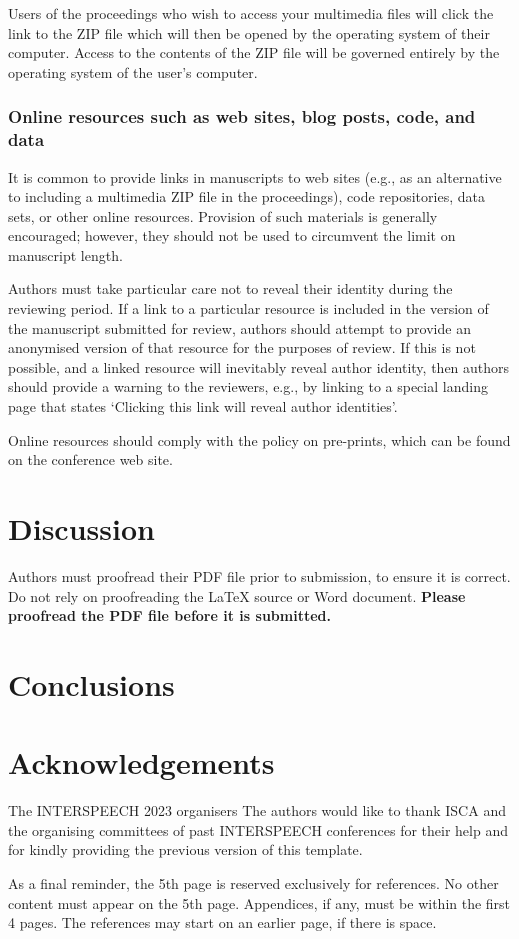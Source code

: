 \documentclass{INTERSPEECH2023}
\begin{document}
Users of the proceedings who wish to access your multimedia files will click the link to the ZIP file which will then be opened by the operating system of their computer. Access to the contents of the ZIP file will be governed entirely by the operating system of the user's computer.

\subsubsection{Online resources such as web sites, blog posts, code, and data}

It is common to provide links in manuscripts to web sites (e.g., as an alternative to including a multimedia ZIP file in the proceedings), code repositories, data sets, or other online resources. Provision of such materials is generally encouraged; however, they should not be used to circumvent the limit on manuscript length.

Authors must take particular care not to reveal their identity during the reviewing period. If a link to a particular resource is included in the version of the manuscript submitted for review, authors should attempt to provide an anonymised version of that resource for the purposes of review. If this is not possible, and a linked resource will inevitably reveal author identity, then authors should provide a warning to the reviewers, e.g., by linking to a special landing page that states `Clicking this link will reveal author identities'.

Online resources should comply with the policy on pre-prints, which can be found on the conference web site.

\section{Discussion}

Authors must proofread their PDF file prior to submission, to ensure it is correct. Do not rely on proofreading the \LaTeX\xspace source or Word document. \textbf{Please proofread the PDF file before it is submitted.}

\section{Conclusions}

\lipsum[66]

\section{Acknowledgements}

\ifinterspeechfinal
     The INTERSPEECH 2023 organisers
\else
     The authors
\fi
would like to thank ISCA and the organising committees of past INTERSPEECH conferences for their help and for kindly providing the previous version of this template.

As a final reminder, the 5th page is reserved exclusively for references. No other content must appear on the 5th page. Appendices, if any, must be within the first 4 pages. The references may start on an earlier page, if there is space.



\end{document}
